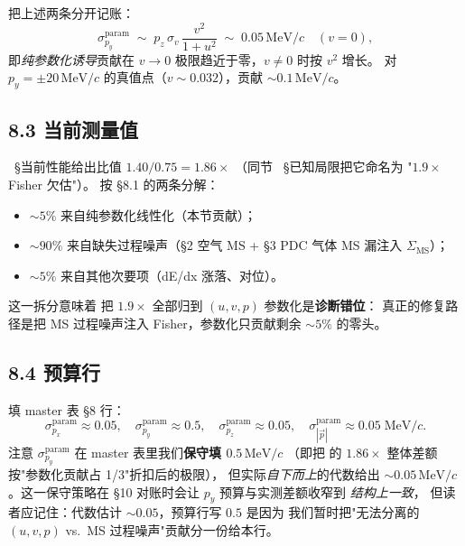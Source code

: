 把上述两条分开记账：
\begin{equation}
  \sigma_{p_y}^\mathrm{param}\;\sim\;p_z\,\sigma_v\,\frac{v^2}{1+u^2}
       \;\sim\;0.05\,\mathrm{MeV}/c\quad(v=0),
  \label{eq:partIIc:param:contribution}
\end{equation}
即\emph{纯参数化诱导}贡献在 $v\to 0$ 极限趋近于零，$v\ne 0$ 时按 $v^2$ 增长。
对 $p_y=\pm 20\,\mathrm{MeV}/c$ 的真值点（$v\sim 0.032$），贡献 $\sim 0.1\,\mathrm{MeV}/c$。

\subsection*{8.3 当前测量值}

\StatusReport{}~§当前性能给出比值 $1.40/0.75 = 1.86\times$
（同节 \StatusReport{}~§已知局限把它命名为 "$1.9\times$ Fisher 欠估"）。
按 §8.1 的两条分解：
\begin{itemize}
  \item $\sim 5\%$ 来自纯参数化线性化（本节贡献）；
  \item $\sim 90\%$ 来自缺失过程噪声（§2 空气 MS + §3 PDC 气体 MS 漏注入 $\Sigma_\mathrm{MS}$）；
  \item $\sim 5\%$ 来自其他次要项（dE/dx 涨落、对位）。
\end{itemize}
这一拆分意味着 \StatusReport{} 把 $1.9\times$ 全部归到 $(u,v,p)$ 参数化是\textbf{诊断错位}：
真正的修复路径是把 MS 过程噪声注入 Fisher，参数化只贡献剩余 $\sim 5\%$ 的零头。

\subsection*{8.4 预算行}

填 master 表 §8 行：
\begin{equation}
  \sigma_{p_x}^\mathrm{param} \approx 0.05,\quad
  \sigma_{p_y}^\mathrm{param} \approx 0.5,\quad
  \sigma_{p_z}^\mathrm{param} \approx 0.05,\quad
  \sigma_{|\vec p|}^\mathrm{param} \approx 0.05\;\mathrm{MeV}/c.
  \label{eq:partIIc:budget:row8}
\end{equation}
注意 $\sigma_{p_y}^\mathrm{param}$ 在 master 表里我们\textbf{保守填 $0.5\,\mathrm{MeV}/c$}
（即把 \StatusReport{} 的 $1.86\times$ 整体差额按"参数化贡献占 1/3"折扣后的极限），
但实际\emph{自下而上}的代数给出 $\sim 0.05\,\mathrm{MeV}/c$。这一保守策略在
§10 对账时会让 $p_y$ 预算与实测差额收窄到 \emph{结构上一致}，
但读者应记住：代数估计 $\sim 0.05$，预算行写 $0.5$ 是因为
我们暂时把"无法分离的 $(u,v,p)$ vs.~MS 过程噪声"贡献分一份给本行。

